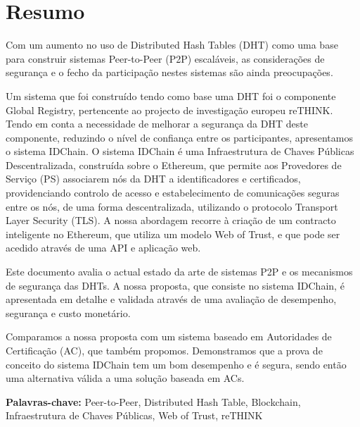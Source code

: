 \chapter*{Resumo}


Com um aumento no uso de Distributed Hash Tables (DHT) como uma base para construir sistemas Peer-to-Peer (P2P) escaláveis, as considerações de segurança e o fecho da participação nestes sistemas são ainda preocupações.

Um sistema que foi construído tendo como base uma DHT foi o componente Global Registry, pertencente ao projecto de investigação europeu reTHINK.
Tendo em conta a necessidade de melhorar a segurança da DHT deste componente, reduzindo o nível de confiança entre os participantes, apresentamos o sistema IDChain.
O sistema IDChain é uma Infraestrutura de Chaves Públicas Descentralizada, construída sobre o Ethereum, que permite aos Provedores de Serviço (PS) associarem nós da DHT a identificadores e certificados, providenciando controlo de acesso e estabelecimento de comunicações seguras entre os nós, de uma forma descentralizada, utilizando o protocolo Transport Layer Security (TLS).
A nossa abordagem recorre à criação de um contracto inteligente no Ethereum, que utiliza um modelo Web of Trust, e que pode ser acedido através de uma API e aplicação web.

Este documento avalia o actual estado da arte de sistemas P2P e os mecanismos de segurança das DHTs.
A nossa proposta, que consiste no sistema IDChain, é apresentada em detalhe e validada através de uma avaliação de desempenho, segurança e custo monetário.

Comparamos a nossa proposta com um sistema baseado em Autoridades de Certificação (AC), que também propomos.
Demonstramos que a prova de conceito do sistema IDChain tem um bom desempenho e é segura, sendo então uma alternativa válida a uma solução baseada em ACs.

\vspace{1cm}

\textbf{\Large Palavras-chave:} Peer-to-Peer, Distributed Hash Table, Blockchain, Infraestrutura de Chaves Públicas, Web of Trust, reTHINK

\cleardoublepage

